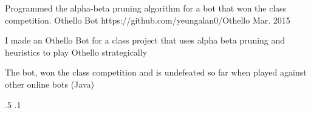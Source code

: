 \begin{cventries}






\vspace{-1.25em}
\myProject
{Programmed the alpha-beta pruning algorithm for a bot that won the class competition.} %
{Othello Bot} %
{https://github.com/yeungalan0/Othello} %
{Mar. 2015} %
{ %
\begin{cvitems}
\item {I made an Othello Bot for a class project that uses alpha beta pruning and heuristics to play Othello strategically}
\item {The bot, won the class competition and is undefeated so far when played against other online bots (Java)}
\end{cvitems}
}
{.5}
{.1}


\end{cventries}
